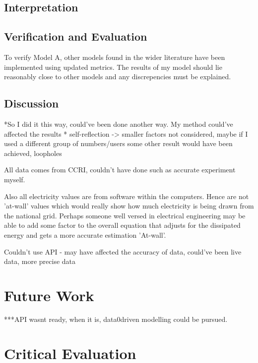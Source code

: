 \subsection{Interpretation}


\subsection{Verification and Evaluation}

To verify Model A, other models found in the wider literature have been implemented using updated metrics. The results of my model should lie reasonably close to other models and any discrepencies must be explained. 


\subsection{Discussion}
*So I did it this way, could've been done another way. My method could've affected the results
* self-reflection -> smaller factors not considered, maybe if I used a different group of numbers/users some other result would have been achieved, loopholes

All data comes from CCRI, couldn't have done such as accurate experiment myself.

Also all electricity values are from software within the computers. Hence are not 'at-wall' values which would really show how much electricity is being drawn from the national grid. Perhaps someone well versed in electrical engineering may be able to add some factor to the overall equation that adjusts for the dissipated energy and gets a more accurate estimation 'At-wall'.

Couldn't use API - may have affected the accuracy of data, could've been live data, more precise data




\section{Future Work}

***API wasnt ready, when it is, data0driven modelling could be pursued.

\section{Critical Evaluation}

